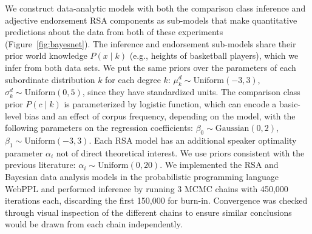 \documentclass[doc]{apa6}
\begin{document}
We construct data-analytic models with both the comparison class inference and adjective endorsement RSA components as sub-models that make quantitative predictions about the data from both of these experiments (Figure~\ref{fig:bayesnet}).
The inference and endorsement sub-models share their prior world knowledge $P(x \mid k)$ (e.g., heights of basketball players), which we infer from both data sets.
We put the same priors over the parameters of each subordinate distribution $k$ for each degree $k$: $\mu^d_k \sim \text{Uniform}(-3, 3)$, $\sigma^d_k \sim \text{Uniform}(0, 5)$, since they have standardized units.
The comparison class prior $P(c \mid k)$ is parameterized by logistic function, which can encode a basic-level bias and an effect of corpus frequency, depending on the model, with the following parameters on the regression coefficients:  $\beta_0 \sim \text{Gaussian}(0, 2)$, $\beta_1 \sim \text{Uniform}(-3, 3)$. 
Each RSA model has an additional speaker optimality parameter $\alpha_{i}$ not of direct theoretical interest.
We use priors consistent with the previous literature: $\alpha_i \sim \text{Uniform}(0, 20)$.
We implemented the RSA and Bayesian data analysis models in the probabilistic programming language WebPPL \cite{dippl} and performed inference by running 3 MCMC chains with 450,000 iterations each, discarding the first 150,000 for burn-in. 
Convergence was checked through visual inspection of the different chains to ensure similar conclusions would be drawn from each chain independently. 

\end{document}
